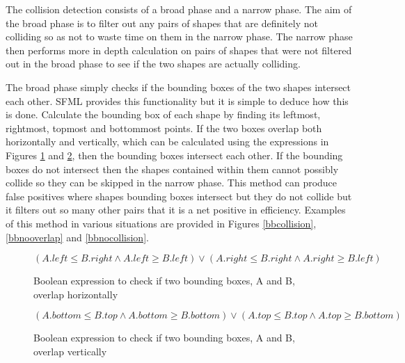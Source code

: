 \documentclass[]{report}
\begin{document}
			The collision detection consists of a broad phase and a narrow phase. The aim of the broad phase is to filter out any pairs of shapes that are definitely not colliding so as not to waste time on them in the narrow phase. The narrow phase then performs more in depth calculation on pairs of shapes that were not filtered out in the broad phase to see if the two shapes are actually colliding.
			
			The broad phase simply checks if the bounding boxes of the two shapes intersect each other. SFML provides this functionality but it is simple to deduce how this is done. Calculate the bounding box of each shape by finding its leftmost, rightmost, topmost and bottommost points. If the two boxes overlap both horizontally and vertically, which can be calculated using the expressions in Figures \ref{horizontalbounding} and \ref{verticalbounding}, then the bounding boxes intersect each other. If the bounding boxes do not intersect then the shapes contained within them cannot possibly collide so they can be skipped in the narrow phase. This method can produce false positives where shapes bounding boxes intersect but they do not collide but it filters out so many other pairs that it is a net positive in efficiency. Examples of this method in various situations are provided in Figures \ref{bbcollision}, \ref{bbnooverlap} and \ref{bbnocollision}.
			
			\begin{figure}[H]
				\centering
				
				\begin{displaymath}
					(A.left \leq B.right \land A.left \geq B.left) \lor (A.right \leq B.right \land A.right \geq B.left)
				\end{displaymath}
				
				\caption{Boolean expression to check if two bounding boxes, A and B, overlap horizontally}
				\label{horizontalbounding}
			\end{figure}
			
			\begin{figure}[H]
				\centering
				
				\begin{displaymath}
				(A.bottom \leq B.top \land A.bottom \geq B.bottom) \lor (A.top \leq B.top \land A.top \geq B.bottom)
				\end{displaymath}
				
				\caption{Boolean expression to check if two bounding boxes, A and B, overlap vertically}
				\label{verticalbounding}
			\end{figure}
			
\end{document}
